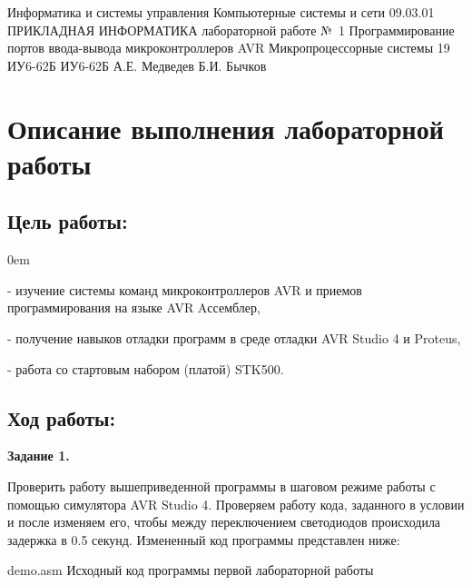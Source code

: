 \documentclass{bmstu}
\begin{document}
\renewcommand\thefigure{\arabic{figure}} 

\def\numberWork{1}

\makereporttitle
    {Информатика и системы управления} %
    {Компьютерные системы и сети} %
    {09.03.01 ПРИКЛАДНАЯ ИНФОРМАТИКА} %
    {лабораторной работе №~1 } %
    { Программирование портов ввода-вывода
микроконтроллеров AVR} %
    { Микропроцессорные системы} %
    { 19 } %
    {ИУ6-62Б} %
    {
    	{ИУ6-62Б}
    	{А.Е. Медведев} %
    	{Б.И. Бычков} %
    } 


\chapter{Описание выполнения лабораторной работы}

\section{Цель работы:}
\begin{description}
\addtolength{\itemindent}{0.80cm}

\itemsep0em 
\item - изучение системы команд микроконтроллеров AVR и приемов программирования на языке AVR Aссемблер,
\item - получение навыков отладки программ в среде отладки AVR Studio 4 и Proteus,
\item - работа со стартовым набором (платой) STK500.
\end{description} 


\section{Ход работы:}
\textbf{Задание 1.}

	Проверить работу вышеприведенной программы в шаговом режиме
работы с помощью симулятора AVR Studio 4.
Проверяем работу кода, заданного в условии и после изменяем его,
чтобы между переключением светодиодов происходила задержка в 0.5 секунд.
Измененный код программы представлен ниже:

    {demo.asm} %
    {Исходный код программы первой лабораторной работы} %
\end{document}
